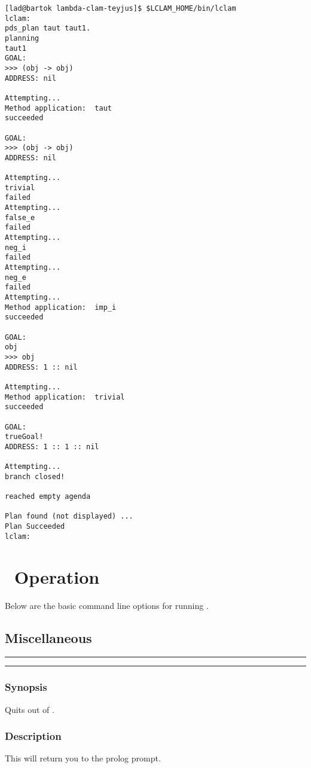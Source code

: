 \begin{small}
\begin{verbatim}
[lad@bartok lambda-clam-teyjus]$ $LCLAM_HOME/bin/lclam
lclam:
pds_plan taut taut1.
planning 
taut1
GOAL:
>>> (obj -> obj)
ADDRESS: nil

Attempting... 
Method application:  taut
succeeded

GOAL:
>>> (obj -> obj)
ADDRESS: nil

Attempting... 
trivial
failed
Attempting... 
false_e
failed
Attempting... 
neg_i
failed
Attempting... 
neg_e
failed
Attempting... 
Method application:  imp_i
succeeded

GOAL:
obj
>>> obj
ADDRESS: 1 :: nil

Attempting... 
Method application:  trivial
succeeded

GOAL:
trueGoal!
ADDRESS: 1 :: 1 :: nil

Attempting... 
branch closed!

reached empty agenda

Plan found (not displayed) ...
Plan Succeeded
lclam:
\end{verbatim}
\end{small}


\section{\lclam\ Operation}
Below are the basic command line options for
running \lclam. 

\subsection{Miscellaneous}
\hrule
\vspace{2mm}
\begin{Large}
\end{Large}
\vspace{2mm}
\hrule
\vspace{2mm}


\subsubsection*{Synopsis}
Quits out of \lclam.  

\subsubsection*{Description}
This will return you to the prolog prompt.


